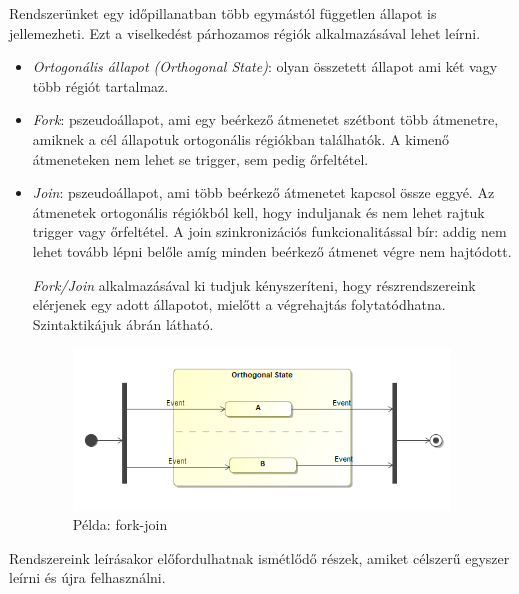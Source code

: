 Rendszerünket egy időpillanatban több egymástól független állapot is jellemezheti. Ezt a viselkedést párhozamos régiók alkalmazásával lehet leírni.
\begin{itemize}
	\item \emph{Ortogonális állapot (Orthogonal State)}: olyan összetett állapot ami két vagy több régiót tartalmaz.
	\item \emph{Fork}: pszeudoállapot, ami egy beérkező átmenetet szétbont több átmenetre, amiknek a cél állapotuk ortogonális régiókban találhatók. A kimenő átmeneteken nem lehet se trigger, sem pedig őrfeltétel.
	\item \emph{Join}: pszeudoállapot, ami több beérkező átmenetet kapcsol össze eggyé. Az átmenetek ortogonális régiókból kell, hogy induljanak és nem lehet rajtuk trigger vagy őrfeltétel. A join szinkronizációs funkcionalitással bír: addig nem lehet tovább lépni belőle amíg minden beérkező átmenet végre nem hajtódott.
	
	\emph{Fork/Join} alkalmazásával ki tudjuk kényszeríteni, hogy részrendszereink elérjenek egy adott állapotot, mielőtt a végrehajtás folytatódhatna. Szintaktikájuk  ábrán látható. 
	
	\begin{figure}[!ht]
		\centering
		\includegraphics[keepaspectratio, width=100mm]{figures/statechart_elements/forkjoin.png}
		\caption{Példa: fork-join}
		\label{fig:forkjoin}
	\end{figure}
	
\end{itemize}
Rendszereink leírásakor előfordulhatnak ismétlődő részek, amiket célszerű egyszer leírni és újra felhasználni.
